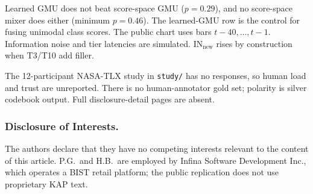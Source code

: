 \documentclass{llncs}
\begin{document}
Learned GMU does not beat score-space GMU ($p=0.29$), and no score-space mixer does either (minimum $p=0.46$). The learned-GMU row is the control for fusing unimodal class scores. The public chart uses bars $t-40,\ldots,t-1$. Information noise and tier latencies are simulated. $\mathrm{IN}_{\mathrm{new}}$ rises by construction when T3/T10 add filler.

The 12-participant NASA-TLX study in \texttt{study/} has no responses, so human load and trust are unreported. There is no human-annotator gold set; polarity is silver codebook output. Full disclosure-detail pages are absent.

\subsubsection{Disclosure of Interests.} The authors declare that they have no competing interests relevant to the content of this article. P.G.\ and H.B.\ are employed by Infina Software Development Inc., which operates a BIST retail platform; the public replication does not use proprietary KAP text.



\end{document}
